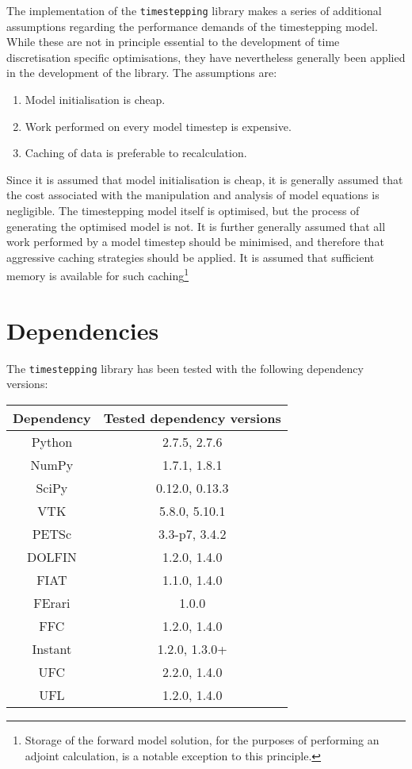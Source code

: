 \documentclass[a4paper]{book}
\begin{document}
The implementation of the \verb+timestepping+ library makes a series of
additional assumptions regarding the performance demands of the timestepping
model. While these are not in principle essential to the development of time
discretisation specific optimisations, they have nevertheless generally been
applied in the development of the library. The assumptions are:
\begin{enumerate}
  \item Model initialisation is cheap.
  \item Work performed on every model timestep is expensive.
  \item Caching of data is preferable to recalculation.
\end{enumerate}
Since it is assumed that model initialisation is cheap, it is generally assumed
that the cost associated with the manipulation and analysis of model equations
is negligible. The timestepping model itself is optimised, but the process of
generating the optimised model is not. It is further generally assumed that
all work performed by a model timestep should be minimised, and therefore
that aggressive caching strategies should be applied. It is assumed that
sufficient memory is available for such caching\footnote{Storage of the forward
model solution, for the purposes of performing an adjoint calculation, is a
notable exception to this principle.}

\section{Dependencies}

The \verb+timestepping+ library has been tested with the following dependency
versions:

\begin{center}
\begin{tabular}{| c | c | }
\hline
Dependency  & Tested dependency versions \\
\hline
Python  & 2.7.5, 2.7.6 \\
\hline
NumPy  & 1.7.1, 1.8.1 \\
SciPy  & 0.12.0, 0.13.3 \\
VTK    & 5.8.0, 5.10.1 \\
PETSc  & 3.3-p7, 3.4.2 \\
\hline
DOLFIN   & 1.2.0, 1.4.0 \\
FIAT     & 1.1.0, 1.4.0 \\
FErari   & 1.0.0 \\
FFC      & 1.2.0, 1.4.0 \\
Instant  & 1.2.0, 1.3.0+ \\
UFC      & 2.2.0, 1.4.0 \\
UFL      & 1.2.0, 1.4.0
\hline
\end{tabular}
\end{center}
\end{document}

